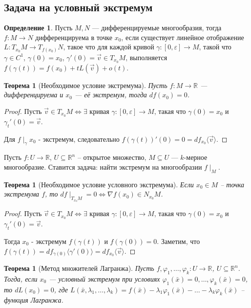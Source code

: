 \documentclass[a5paper]{article}
\newcounter{through}
\theoremstyle{plain}
\newtheorem{theorem}[through]{Теорема}
\theoremstyle{definition}
\newtheorem{definition}[through]{Определение}
\numberwithin{through}{section}
\numberwithin{equation}{section}
\begin{document}
\subsection{Задача на условный экстремум}

\begin{definition}
	Пусть $M, N$ --- дифференцируемые многообразия, тогда $f : M \to N$ дифференцируема в точке $x_0$, если существует линейное отображение $L : T_{x_0}M \to T_{f(x_0)}N$, такое что для каждой кривой $\gamma : [0, \varepsilon] \to M$, такой что $\gamma \in C^1$, $\gamma(0)=x_0$, $\gamma'(0)=\vec{v} \in T_{x_0}M$, выполняется $f(\gamma(t)) = f(x_0) + tL(\vec{v}) + o(t)$.
\end{definition}

\begin{theorem}[Необходимое условие экстремума]
	Пусть $f: M \to \mathbb{R}$ --- дифференцируема и $x_0$ --- её экстремум, тогда $df(x_0) = 0$.
\end{theorem}

\begin{proof}
	Пусть $\vec{v} \in T_{x_0}M \Longleftrightarrow \exists $ кривая $\gamma : [0, \varepsilon] \to M$, такая что $\gamma(0) = x_0$ и $\gamma_t'(0) = \vec{v}$.
	
	Для $f \mid_{\gamma} x_0$ - экстремум, следовательно $f(\gamma(t))'(0)=0=df_{x_0}\langle\vec{v}\rangle$.
\end{proof}

Пусть $f: U \to \mathbb{R}$, $U \subseteq \mathbb{R}^n$ -- открытое множество, $M \subseteq U$ --- $k$-мерное многообразие. Ставится задача: найти экстремум на многообразии $f\mid_{M}$.

\begin{theorem}[Необходимое условие условного экстремума]
	Если $x_0 \in M$ -- точка экстремума $f$, то $df\mid_{T_{x_0}M} = 0 \Leftrightarrow \nabla f(x_0) \in N_{x_0}M$.
\end{theorem}

\begin{proof}
	Пусть $\vec{v} \in T_{x_0}M \Longleftrightarrow \exists $ кривая $\gamma : [0, \varepsilon] \to M$, такая что $\gamma(0) = x_0$ и $\gamma_t'(0) = \vec{v}$.
	
	Тогда $x_0$ - экстремум $f(\gamma(t))$ и $f(\gamma(0)) = 0$. Заметим, что $f(\gamma(t))= df_{\gamma(0)}\langle \gamma'(0)\rangle=df_{x_0} \langle \vec{v} \rangle$.
\end{proof}

\begin{theorem}[Метод множителей Лагранжа]
	Пусть $f, \varphi_1, \ldots, \varphi_k : U \to \mathbb{R}$, $U \subseteq \mathbb{R}^n$. Тогда, если $x_0$ --- условный экстремум при условиях $\varphi_1(\bar{x}) = 0, \ldots, \varphi_k(\bar{x})  = 0$, то $dL(x_0) = 0$, где $L(\bar{x}, \lambda_1, \ldots, \lambda_k)=f(\bar{x}) - \lambda_1\varphi_1(\bar{x}) - \ldots - \lambda_k\varphi_k(\bar{x})$ -- функция Лагранжа.
\end{theorem}
\end{document}
